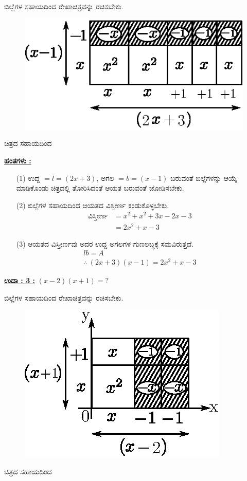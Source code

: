 ಬಿಲ್ಲೆಗಳ ಸಹಾಯದಿಂದ ರೇಖಾಚಿತ್ರವನ್ನು ರಚಿಸಬೇಕು.
\begin{figure}[H]
\centering
\includegraphics[scale=0.9]{src/figure/chap3/fig3-31b.eps}
\end{figure}
ಚಿತ್ರದ ಸಹಾಯದಿಂದ 

\noindent
{\textbf{\underline{ಹಂತಗಳು :}}}

\begin{itemize}
\item [(1)] ಉದ್ದ $= l = (2x + 3)$, ಅಗಲ $= b = (x - 1)$ ಬರುವಂತೆ ಬಿಲ್ಲೆಗಳನ್ನು ಆಯ್ಕೆ ಮಾಡಿಕೊಂಡು ಚಿತ್ರದಲ್ಲಿ ತೋರಿಸಿದಂತೆ ಆಯತ ಬರುವಂತೆ ಜೋಡಿಸಬೇಕು. 
\item [(2)] ಬಿಲ್ಲೆಗಳ ಸಹಾಯದಿಂದ ಆಯತದ ವಿಸ್ತೀರ್ಣ ಕಂಡುಕೊಳ್ಳಬೇಕು.
\begin{align*}
\text{ವಿಸ್ತೀರ್ಣ} & = x^2 + x^2 + 3x - 2x - 3\\
& = 2x^2 + x - 3
\end{align*}
\item [(3)] ಆಯತದ ವಿಸ್ತೀರ್ಣವು ಅದರ ಉದ್ದ ಅಗಲಗಳ ಗುಣಲಬ್ಧಕ್ಕೆ ಸಮವಿರುತ್ತದೆ.
\begin{gather*}
lb = A\\
\therefore~ (2x + 3)(x - 1) = 2x^2 + x - 3
\end{gather*}
\end{itemize}

\noindent
{\textbf{\underline{ಉದಾ : 3 :}}} $(x - 2)(x + 1) = ?$

ಬಿಲ್ಲೆಗಳ ಸಹಾಯದಿಂದ ರೇಖಾಚಿತ್ರವನ್ನು ರಚಿಸಬೇಕು.
\begin{figure}[H]
\centering
\includegraphics[scale=0.8]{src/figure/chap3/fig3-31c.eps}
\end{figure}
ಚಿತ್ರದ ಸಹಾಯದಿಂದ 

